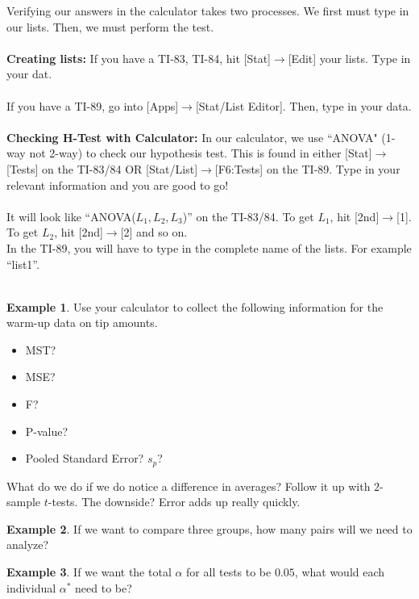 \documentclass[12pt]{amsart}
\theoremstyle{definition}
\newtheorem{ex}{Example}
\begin{document}
\noindent Verifying our answers in the calculator takes two processes. We first must type in our lists. Then, we must perform the test.\\
~\\
\noindent \textbf{Creating lists:} If you have a TI-83, TI-84, hit [Stat]$\rightarrow$[Edit] your lists. Type in your dat.\\
~\\
If you have a TI-89, go into [Apps]$\rightarrow$[Stat/List Editor]. Then, type in your data.\\
~\\
\noindent \textbf{Checking H-Test with Calculator:} In our calculator, we use ``ANOVA" (1-way not 2-way) to check our hypothesis test. This is found in either [Stat]$\rightarrow$[Tests] on the TI-83/84 OR [Stat/List]$\rightarrow$[F6:Tests] on the TI-89. Type in your relevant information and you are good to go!\\
~\\
It will look like ``ANOVA($L_1,L_2,L_3$)'' on the TI-83/84. To get $L_1$, hit [2nd]$\rightarrow$[1]. To get $L_2$, hit [2nd]$\rightarrow$[2] and so on.\\
In the TI-89, you will have to type in the complete name of the lists. For example ``list1''.\\
~\\
\begin{ex} Use your calculator to collect the following information for the warm-up data on tip amounts.\end{ex}
\begin{itemize}
 \item MST?
 \item MSE?
 \item F?
 \item P-value?
 \item Pooled Standard Error? $s_p$?
\end{itemize}

\newpage
\noindent What do we do if we do notice a difference in averages? Follow it up with $2$-sample $t$-tests. The downside? Error adds up really quickly.\\
\begin{ex}
 If we want to compare three groups, how many pairs will we need to analyze?
\end{ex}

\vspace{0.5in}

\begin{ex}
 If we want the total $\alpha$ for all tests to be $0.05$, what would each individual $\alpha^*$ need to be?
\end{ex}
\vspace{1in}
\end{document}
